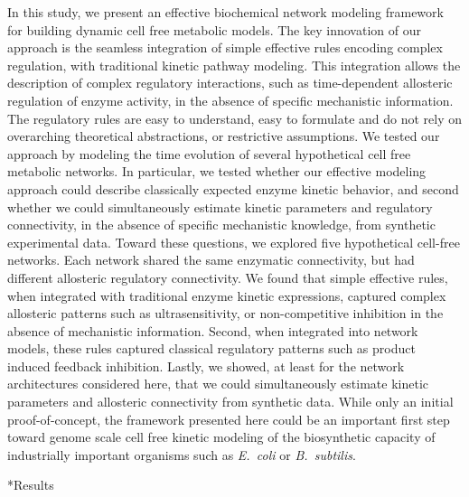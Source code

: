 \documentclass[12pt]{article}
\makeatletter
\renewcommand\section{\@startsection
	{subsection}{2}{0mm}
	{-0.2in}
	{0.05\baselineskip}
	{\normalfont\large\bfseries}}
\makeatother
\begin{document}
In this study, we present an effective biochemical network modeling framework for building dynamic cell free metabolic models.
The key innovation of our approach is the seamless integration of simple effective rules encoding complex regulation, with traditional kinetic pathway modeling.
This integration allows the description of complex regulatory interactions, such as time-dependent allosteric regulation of enzyme activity, in the absence of specific mechanistic information.
The regulatory rules are easy to understand, easy to formulate 
and do not rely on overarching theoretical abstractions, or restrictive assumptions.
We tested our approach by modeling the time evolution of several hypothetical cell free metabolic networks. 
In particular, we tested whether our effective modeling approach could describe classically expected enzyme kinetic behavior, 
and second whether we could simultaneously estimate kinetic parameters and regulatory connectivity, in the absence of specific mechanistic knowledge, 
from synthetic experimental data. Toward these questions, we explored five hypothetical cell-free networks. 
Each network shared the same enzymatic connectivity, but had different allosteric regulatory connectivity. 
We found that simple effective rules, when integrated with traditional enzyme kinetic expressions,
captured complex allosteric patterns such as ultrasensitivity, or non-competitive inhibition in the absence of mechanistic information. 
Second, when integrated into network models, these rules captured classical regulatory patterns such as product induced feedback inhibition. 
Lastly, we showed, at least for the network architectures considered here, that we could 
simultaneously estimate kinetic parameters and allosteric connectivity from synthetic data.
While only an initial proof-of-concept, the framework presented here could be an important first step toward genome scale cell free kinetic modeling of the biosynthetic capacity 
of industrially important organisms such as \emph{E.~coli} or \emph{B.~subtilis}.

\clearpage

\section*{Results}
\end{document}
